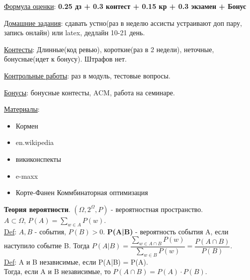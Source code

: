 \documentclass{article}
\newcommand{\tu}[1]{\underline{#1}}
\newcommand{\tb}[1]{\textbf{#1}}
\begin{document}
\large

\tu{Формула оценки}: \tb{0.25 дз + 0.3 контест + 0.15 кр + 0.3 экзамен + Бонус}

\tu{Домашние задания}: сдавать устно(раз в неделю ассисты устраивают доп пару, запись онлайн) или latex, дедлайн 10-21 день.

\tu{Контесты}: Длинные(код ревью), короткие(раз в 2 недели), неточные, бонусные(идет к бонусу). Штрафов нет.

\tu{Контрольные работы}: раз в модуль, тестовые вопросы.

\tu{Бонусы}: бонусные контесты, ACM, работа на семинаре.

\tu{Материалы}:
\begin{itemize}
  \item Кормен
  \item en.wikipedia
  \item викиконспекты
  \item e-maxx
  \item Корте-Фанен Коммбинаторная оптимизация
\end{itemize}

\tb{Теория вероятности}.
$(\Omega, 2^{\Omega}, P)$ - вероятностная пространство.\\
$A \subset \Omega$, $P(A) = \sum_{w \in A} P(w)$. \\
\tu{Def}: $A, B$ - события, $P(B) > 0$. \tb{P(A|B)} - вероятность события A, если наступило событие B. Тогда $P(A|B) = \dfrac{\sum_{w \in A \cap B} P(w)}{\sum_{w \in B} P(w)} = \dfrac{P(A \cap B)}{P(B)}$. \\
\tu{Def}: A и B независимые, если P(A|B) = P(A). \\
Тогда, если A и B независимые, то $P(A \cap B) = P(A) \cdot P(B)$. \\
\end{document}
